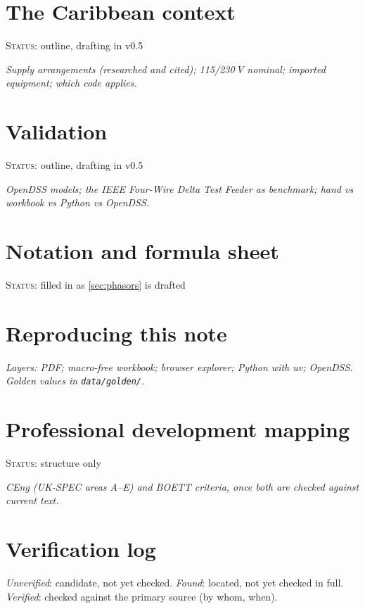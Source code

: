 \documentclass[11pt,a4paper]{article}
\newcommand{\plan}[1]{\par{\small\color{gray}\itshape #1}\par}
\newcommand{\status}[1]{{\small\color{orange!80!black}\textsc{Status:} #1}\par\medskip}
\begin{document}
\section{The Caribbean context}\label{sec:caribbean}
\status{outline, drafting in v0.5}
\plan{Supply arrangements (researched and cited); 115/230\,V nominal; imported equipment; which code applies.}

\section{Validation}\label{sec:validation}
\status{outline, drafting in v0.5}
\plan{OpenDSS models; the IEEE Four-Wire Delta Test Feeder as benchmark; hand vs workbook vs Python vs OpenDSS.}


\nocite{*}


\appendix
\section{Notation and formula sheet}\label{app:notation}
\status{filled in as \cref{sec:phasors} is drafted}

\section{Reproducing this note}\label{app:reproducing}
\plan{Layers: PDF; macro-free workbook; browser explorer; Python with uv; OpenDSS. Golden values in \texttt{data/golden/}.}

\section{Professional development mapping}\label{app:prof-dev}
\status{structure only}
\plan{CEng (UK-SPEC areas A--E) and BOETT criteria, once both are checked against current text.}

\section{Verification log}\label{app:verification}
\noindent\textit{Unverified}: candidate, not yet checked. \textit{Found}: located, not yet checked in full. \textit{Verified}: checked against the primary source (by whom, when).
\end{document}
